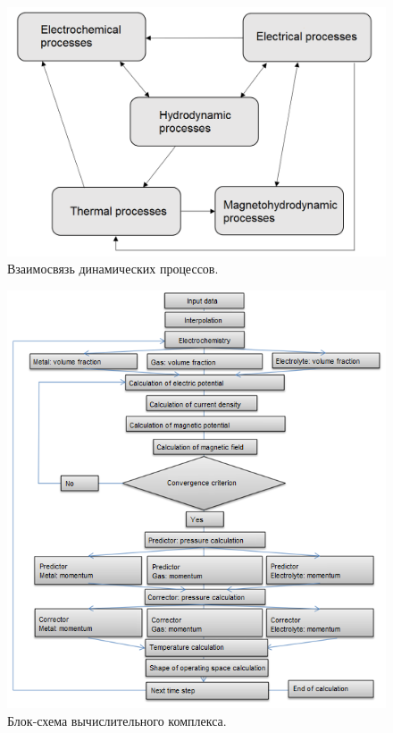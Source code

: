 \documentclass[pdflatex,sn-mathphys-gost]{pmi-jnl}
\begin{document}
\begin{figure}[ht]
    \centering
    \includegraphics[width=\textwidth]{схема взаимодействия.png}
    \caption{Взаимосвязь динамических процессов.}
    \label{fig:vliyanie1}
\end{figure}

\begin{figure}[ht]
    \centering
    \includegraphics[width=\textwidth]{блоксхема.png}
    \caption{ Блок-схема вычислительного комплекса.}
    \label{fig:vliyanie2}
\end{figure}
\end{document}
